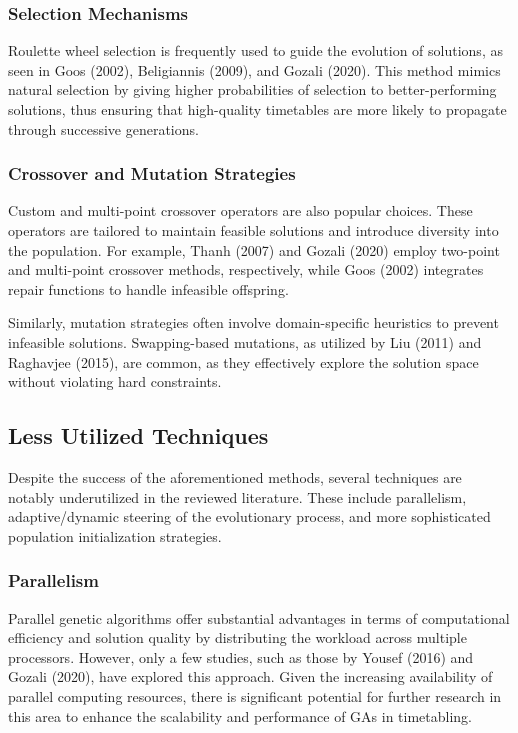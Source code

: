 \documentclass[sigconf]{acmart}
\begin{document}
\subsubsection{Selection Mechanisms}
Roulette wheel selection is frequently used to guide the evolution of
solutions, as seen in Goos (2002), Beligiannis (2009), and Gozali (2020).
This method mimics natural selection by giving higher probabilities of
selection to better-performing solutions, thus ensuring that high-quality
timetables are more likely to propagate through successive generations.

\subsubsection{Crossover and Mutation Strategies}
Custom and multi-point crossover operators are also popular choices.
These operators are tailored to maintain feasible solutions and introduce
diversity into the population. For example, Thanh (2007) and Gozali (2020)
employ two-point and multi-point crossover methods, respectively, while Goos
(2002) integrates repair functions to handle infeasible offspring.

Similarly, mutation strategies often involve domain-specific heuristics to
prevent infeasible solutions. Swapping-based mutations, as utilized by
Liu (2011) and Raghavjee (2015), are common, as they effectively explore the
solution space without violating hard constraints.

\subsection{Less Utilized Techniques}
Despite the success of the aforementioned methods, several techniques are
notably underutilized in the reviewed literature. These include parallelism,
adaptive/dynamic steering of the evolutionary process, and more sophisticated
population initialization strategies.

\subsubsection{Parallelism}
Parallel genetic algorithms offer substantial advantages in terms of
computational efficiency and solution quality by distributing the workload
across multiple processors. However, only a few studies, such as those by
Yousef (2016) and Gozali (2020), have explored this approach. Given the
increasing availability of parallel computing resources, there is significant
potential for further research in this area to enhance the scalability and
performance of GAs in timetabling.
\end{document}
